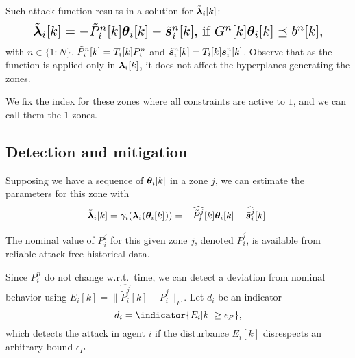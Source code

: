 \documentclass{ifacconf}  %
\begin{document}
Such attack function results in a \pwa{} solution for $\tilde{\boldsymbol{\lambda}}_i[k]$:
\begin{equation}
  \resizebox{.88\columnwidth}{!}{$
    \label{eq:linear_cheating}
    \lambdaicheat[k]=
      -\tilde{P}_{i}^{n}[k]\thetaik-\tilde{\vec{s}}_{i}^{n}[k]\text{, if}\ G^{n}[k]\thetaik \preceq b^{n}[k],
    $}
\end{equation}
with $n\in\{1\mathbin{:}N\}$, $\tilde{P}_{i}^{n}[k]=\Tik P_{i}^{n}$ and $\tilde{\vec{s}}_{i}^{n}[k]=\Tik\vec{s}_{i}^{n}[k]$.
Observe that as the function is applied only in $\lambdaik$, it does not affect the hyperplanes generating the zones.

We fix the index for these zones where all constraints are active to $1$, and we can call them the $1$-zones.

\subsection{Detection and mitigation}\label{ssec:DM}
Supposing we have a sequence of $\thetaik$ in a zone $j$, we can estimate the parameters for this zone with
\begin{equation}
  \label{eq:lambdafuntheta_tilde}
\lambdaicheat[k]=\gamma_{i}(\lambdai(\thetaik))=-\widehat{\tilde{P}_{i}^{j}}[k]\thetaik-\widehat{\tilde{\vec{s}}_{i}^{j}}[k].
\end{equation}

\begin{assumption}\label{ass:Pnominal}
  The nominal value of $P_{i}^{j}$ for this given zone $j$, denoted $\bar{P}_{i}^{j}$, is available from reliable attack-free historical data.
\end{assumption}

Since $P_{i}^{n}$ do not change w.r.t.\ time, we can detect a deviation from nominal behavior using ${E_{i}[k] =\|\widehat{\tilde{P}_{i}^{j}}[k]-\bar{P}_{i}^{j}\|_{F}}$.
Let ${d_{i}}$ be an indicator
\begin{equation}
  \label{eq:2}
  d_{i}=\indicator{E_{i}[k]\geq\epsilon_{P}},
\end{equation}
which detects the attack in agent $i$
if the disturbance $E_{i}[k]$ disrespects an arbitrary bound $\epsilon_{P}$.
\end{document}
